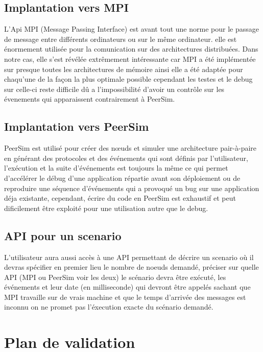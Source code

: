 \documentclass{article}
\begin{document}
			\subsection{Implantation vers MPI}
			L'Api MPI (Message Passing Interface) est avant tout une norme pour le passage de message entre différents ordinateurs ou sur le même ordinateur.
			elle est énormement utilisée pour la comunication sur des architectures distribuées.
			Dans notre cas, elle s'est révélée extrêmement intéressante car MPI a été implémentée sur presque toutes les architectures de mémoire ainsi elle 
			a été adaptée pour chaqu'une de la façon la plus optimale possible cependant les testes et le debug sur celle-ci reste difficile dû a l'impossibilité 
			d'avoir un contrôle sur les évenements qui apparaissent contrairement à PeerSim.
			\subsection{Implantation vers PeerSim}
			PeerSim est utilisé pour créer des nœuds et simuler une architecture pair-à-paire en générant des protocoles et des événements 
			qui sont définis par l'utilisateur, l'exécution et la suite d'événements est toujours la même ce qui permet d'accélérer 
			le débug d'une application répartie avant son déploiement ou de reproduire une séquence d'événements qui a provoqué un bug
			sur une application déja existante, cependant, écrire du code en PeerSim est exhaustif et peut dificilement être exploité pour une utilisation
			autre que le debug.
			\subsection{API pour un scenario}
			L'utilisateur aura aussi accès à une API permettant de décrire un scenario où il devras spécifier en premier lieu
			le nombre de noeuds demandé, préciser sur quelle API (MPI ou PeerSim voir les deux) le scénario devra être exécuté, les événements et leur date (en milliseconde) qui devront être appelés 
			sachant que MPI travaille sur de vrais machine et que le temps d'arrivée des messages est inconnu on ne promet pas l'éxecution exacte du scénario demandé. 

		\section{Plan de validation}
\end{document}
